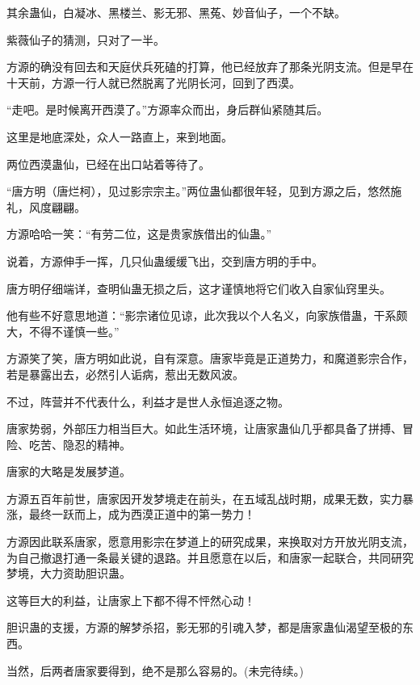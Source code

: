 \begin{this_body}
其余蛊仙，白凝冰、黑楼兰、影无邪、黑菟、妙音仙子，一个不缺。

紫薇仙子的猜测，只对了一半。

方源的确没有回去和天庭伏兵死磕的打算，他已经放弃了那条光阴支流。但是早在十天前，方源一行人就已然脱离了光阴长河，回到了西漠。

“走吧。是时候离开西漠了。”方源率众而出，身后群仙紧随其后。

这里是地底深处，众人一路直上，来到地面。

两位西漠蛊仙，已经在出口站着等待了。

“唐方明（唐烂柯），见过影宗宗主。”两位蛊仙都很年轻，见到方源之后，悠然施礼，风度翩翩。

方源哈哈一笑：“有劳二位，这是贵家族借出的仙蛊。”

说着，方源伸手一挥，几只仙蛊缓缓飞出，交到唐方明的手中。

唐方明仔细端详，查明仙蛊无损之后，这才谨慎地将它们收入自家仙窍里头。

他有些不好意思地道：“影宗诸位见谅，此次我以个人名义，向家族借蛊，干系颇大，不得不谨慎一些。”

方源笑了笑，唐方明如此说，自有深意。唐家毕竟是正道势力，和魔道影宗合作，若是暴露出去，必然引人诟病，惹出无数风波。

不过，阵营并不代表什么，利益才是世人永恒追逐之物。

唐家势弱，外部压力相当巨大。如此生活环境，让唐家蛊仙几乎都具备了拼搏、冒险、吃苦、隐忍的精神。

唐家的大略是发展梦道。

方源五百年前世，唐家因开发梦境走在前头，在五域乱战时期，成果无数，实力暴涨，最终一跃而上，成为西漠正道中的第一势力！

方源因此联系唐家，愿意用影宗在梦道上的研究成果，来换取对方开放光阴支流，为自己撤退打通一条最关键的退路。并且愿意在以后，和唐家一起联合，共同研究梦境，大力资助胆识蛊。

这等巨大的利益，让唐家上下都不得不怦然心动！

胆识蛊的支援，方源的解梦杀招，影无邪的引魂入梦，都是唐家蛊仙渴望至极的东西。

当然，后两者唐家要得到，绝不是那么容易的。(未完待续。)

\end{this_body}

